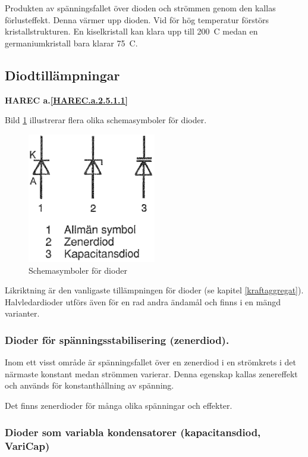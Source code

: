 Produkten av spänningsfallet över dioden och strömmen genom den kallas
förlusteffekt. Denna värmer upp dioden. Vid för hög temperatur förstörs
kristallstrukturen. En kiselkristall kan klara upp till 200~\degree C medan en
germaniumkristall bara klarar 75~\degree C.

\subsection{Diodtillämpningar}
\textbf{HAREC a.\ref{HAREC.a.2.5.1.1}\label{myHAREC.a.2.5.1.1}}

Bild \ref{fig:BildII2-14} illustrerar flera olika schemasymboler för
dioder.

\begin{figure}
\includegraphics[width=0.5\textwidth]{images/cropped_pdfs/bild_2_2-14.pdf}
\caption{Schemasymboler för dioder}
\label{fig:BildII2-14}
\end{figure}

Likriktning är den vanligaste tillämpningen för dioder (se kapitel \ref{kraftaggregat}).
Halvledardioder utförs även för en rad andra ändamål och finns i en mängd
varianter.

\subsubsection{Dioder för spänningsstabilisering (zenerdiod).}

  Inom ett visst område är spänningsfallet över en zenerdiod i en strömkrets
  i det närmaste konstant medan strömmen varierar. Denna egenskap kallas
  zenereffekt och används för konstanthållning av spänning.

  Det finns zenerdioder för många olika spänningar och effekter.

\subsubsection{Dioder som variabla kondensatorer (kapacitansdiod, VariCap)}
\label{varicap}

